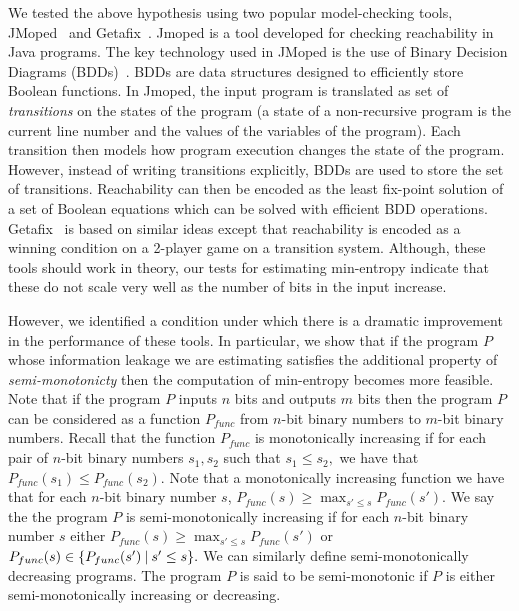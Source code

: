 We tested the above  hypothesis using two popular model-checking tools, JMoped~\cite{Jmoped} and Getafix~\cite{getafix}. 
Jmoped is a tool developed for checking reachability in Java programs. The key technology used in JMoped is the use of Binary Decision Diagrams (BDDs)~\cite{}. BDDs are data structures designed to efficiently   store Boolean functions. In Jmoped, the input program is translated  as set of \emph{transitions} on the states of the program (a state of a non-recursive program is the current line number and the values of the variables of the program). Each transition  then models how program execution changes the state of the program.  However, instead of writing transitions explicitly,
BDDs are used to store the set of transitions.  Reachability can then be encoded as  the least fix-point solution of a set of Boolean equations which can be solved with efficient BDD operations. Getafix~\cite{} is based on similar ideas except that reachability is encoded as a winning condition on a 2-player game on a  transition system. 
Although, these tools should work in theory, our tests for estimating min-entropy indicate that these do not scale very well  as the number of bits in the input increase. 


However, we  identified a condition under which there is a dramatic improvement in the performance of these tools. In particular, we show that if the program $P$ whose information leakage we are estimating satisfies the additional property of \emph{semi-monotonicty} then the computation of min-entropy becomes more feasible. Note that  
  if the program $P$ inputs $n$ bits and outputs $m$ bits then the program $P$ can be considered as  a function $P_{func}$ from $n$-bit binary numbers to $m$-bit binary numbers. Recall that the function $P_{func}$ is monotonically increasing  if  for each pair of $n$-bit  binary numbers $s_1, s_2$  such that  $s_1\leq s_2,$ we have that $P_{func}(s_1) \leq P_{func}(s_2).$ Note that a monotonically increasing  function we have that for each $n$-bit binary number $s$, $P_{func}(s) \geq \max_{ s'\leq s} {P_{func}(s')}.$
    We say the the program $P$ is semi-monotonically increasing if for each $n$-bit  binary number $s$ either $P_{func}(s) \geq \max_{ s'\leq s}{P_{func}(s')}$ or $P_{func}(s) \in \{ P_{func}(s') \mathbin{|} s'\leq s \}.$ We can similarly define semi-monotonically decreasing programs. The program $P$ is said to be semi-monotonic if $P$ is either 
    semi-monotonically increasing or decreasing. 

